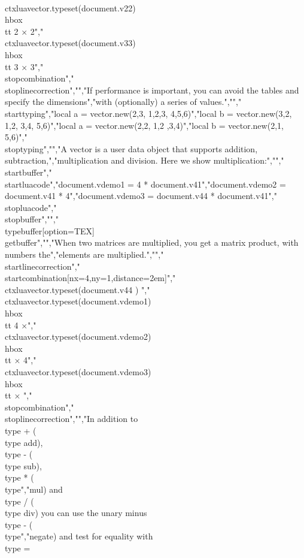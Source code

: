 {\\ctxlua{vector.typeset(document.v22)}} {\\hbox{\\tt 2 × 2}}","    {\\ctxlua{vector.typeset(document.v33)}} {\\hbox{\\tt 3 × 3}}","\\stopcombination","\\stoplinecorrection","","If performance is important, you can avoid the tables and specify the dimensions","with (optionally) a series of values.","","\\starttyping","local a = vector.new(2,3, 1,2,3, 4,5,6)","local b = vector.new(3,2, 1,2, 3,4, 5,6)","local a = vector.new(2,2, 1,2 ,3,4)","local b = vector.new(2,1, 5,6)","\\stoptyping","","A vector is a user data object that supports addition, subtraction,","multiplication and division. Here we show multiplication:","","\\startbuffer","\\startluacode","document.vdemo1 = 4 * document.v41","document.vdemo2 = document.v41 * 4","document.vdemo3 = document.v44 * document.v41","\\stopluacode","\\stopbuffer","","\\typebuffer[option=TEX] \\getbuffer","","When two matrices are multiplied, you get a matrix product, with numbers the","elements are multiplied.","","\\startlinecorrection","\\startcombination[nx=4,ny=1,distance=2em]","    {\\ctxlua{vector.typeset(document.v44   )}} {}","    {\\ctxlua{vector.typeset(document.vdemo1)}} {\\hbox{\\tt 4 ×}}","    {\\ctxlua{vector.typeset(document.vdemo2)}} {\\hbox{\\tt × 4}}","    {\\ctxlua{vector.typeset(document.vdemo3)}} {\\hbox{\\tt ×  }}","\\stopcombination","\\stoplinecorrection","","In addition to \\type {+} (\\type {add}), \\type {-} (\\type {sub}), \\type {*} (\\type","{mul}) and \\type {/} (\\type {div}) you can use the unary minus \\type {-} (\\type","{negate}) and test for equality with \\type {=} 